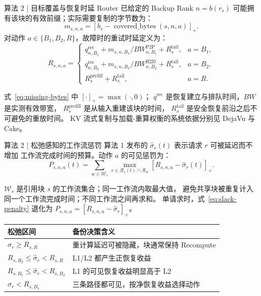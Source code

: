 \begin{frame}{算法 2 | 目标覆盖与恢复时延}
  \small
  Router 已给定的 Backup Rank $n=b(r_s)$ 可能拥有该块的有效前缀；实际需要复制的字节数为：
  \begin{equation}
    m_{s,n,a}
    =
    \left[
      b_s-\operatorname{covered\_bytes}(s,n,a)
    \right]_+.
    \label{eq:missing-bytes}
  \end{equation}
  对动作 $a\in\{B_1,B_2,R\}$，故障时的重试时延定义为：
  \begin{equation}
    R_{s,n,a}
    =
    \begin{cases}
      q_{n,B_1}^{\mathrm{rec}}+
      m_{s,n,B_1}/BW_{n,B_1}^{\mathrm{P2P}}+R_s^{\mathrm{tail}},
      & a=B_1,\\
      q_{n,B_2}^{\mathrm{rec}}+
      m_{s,n,B_2}/BW_{n,B_2}^{\mathrm{H2D}}+R_s^{\mathrm{tail}},
      & a=B_2,\\
      R_s^{\mathrm{prefill}}+R_s^{\mathrm{tail}},
      & a=R.
    \end{cases}
    \label{eq:recovery-latency}
  \end{equation}

  \scriptsize
  式~\eqref{eq:missing-bytes} 中 $[\cdot]_+=\max(\cdot,0)$；
  $q^{\mathrm{rec}}$ 是恢复建立与排队时间，$BW$ 是实测有效带宽，
  $R_s^{\mathrm{prefill}}$ 是从输入重建该块的时间，
  $R_s^{\mathrm{tail}}$ 是安全恢复前沿之后不可避免的重放时间。
  KV 流式复制与加载-重算权衡的系统依据分别见
  DejaVu 与 Cake\cite{strati2024dejavu,jin2025cake}。
\end{frame}

\begin{frame}{算法 2 | 松弛感知的工作流惩罚}
  \small
  算法 1 发布的 $\widehat\sigma_r(t)$ 表示请求 $r$ 可被延迟而不增加
  工作流完成时间的预算。动作 $a$ 的可见惩罚为：
  \begin{equation}
    P_{s,n,a}(t)
    =
    \sum_{w\in\mathcal W_s}
    \max_{r\in\mathcal R_s(t)\cap\mathcal R_w}
    \left[
      R_{s,n,a}-\widehat\sigma_r(t)
    \right]_+.
    \label{eq:slack-penalty}
  \end{equation}

  \scriptsize
  $\mathcal W_s$ 是引用块 $s$ 的工作流集合；同一工作流内取最大值，
  避免共享块被重复计入同一个工作流完成时间；不同工作流之间再求和。
  单请求时，式~\eqref{eq:slack-penalty} 退化为
  $P_{s,n,a}=[R_{s,n,a}-\widehat\sigma_r]_+$。

  \vspace{0.10cm}
  \renewcommand{\arraystretch}{1.16}
  \begin{tabularx}{\textwidth}{p{}X}
    \toprule
    松弛区间 & 备份决策含义 \\
    \midrule
    $\widehat\sigma_r\ge R_{s,R}$ & 重计算延迟可被隐藏，块通常保持 Recompute \\
    $R_{s,B_2}\le\widehat\sigma_r<R_{s,R}$ & L1/L2 都产生正恢复收益 \\
    $R_{s,B_1}\le\widehat\sigma_r<R_{s,B_2}$ & L1 的可见恢复收益明显高于 L2 \\
    $\widehat\sigma_r<R_{s,B_1}$ & 三条路径都可见，按净恢复收益选择动作 \\
    \bottomrule
  \end{tabularx}
\end{frame}

